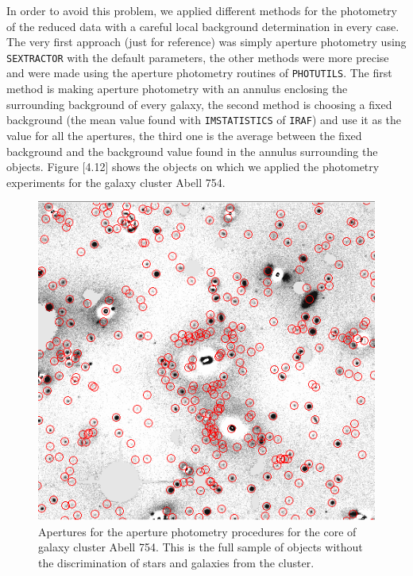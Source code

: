 In order to avoid this problem, we applied different methods for the photometry of the reduced data with a careful local background determination in every case. The very first approach (just for reference) was simply aperture photometry using \texttt{SEXTRACTOR} with the default parameters, the other methods were more precise and were made using the aperture photometry routines of \texttt{PHOTUTILS}. The first method is making aperture photometry with an annulus enclosing the surrounding background of every galaxy, the second method is choosing a fixed background (the mean value found with \texttt{IMSTATISTICS} of \texttt{IRAF}) and use it as the value for all the apertures, the third one is the average between the fixed background and the background value found in the annulus surrounding the objects. Figure [4.12] shows the objects on which we applied the photometry experiments for the galaxy cluster Abell 754.

\begin{figure}[H]
\centering
\includegraphics[width=15cm]{images/aperture_photometry.png}
\caption[Apertures for the aperture photometry procedures on Abell 754]{Apertures for the aperture photometry procedures for the core of galaxy cluster Abell 754. This is the full sample of objects without the discrimination of stars and galaxies from the cluster.}
\end{figure}

